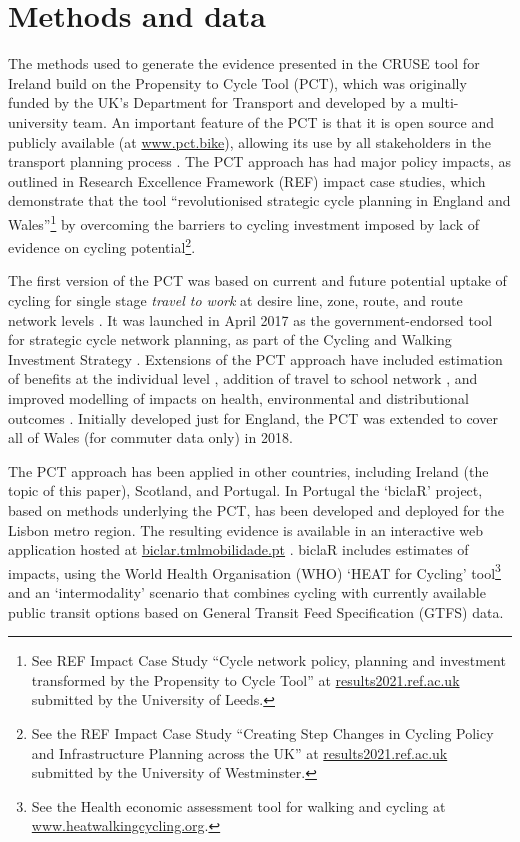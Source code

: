 \documentclass[
  super,
  preprint,
  3p]{elsarticle}
\begin{document}
\hypertarget{sec-methods}{%
\section{Methods and data}\label{sec-methods}}

The methods used to generate the evidence presented in the CRUSE tool
for Ireland build on the Propensity to Cycle Tool (PCT), which was
originally funded by the UK's Department for Transport and developed by
a multi-university team. An important feature of the PCT is that it is
open source and publicly available (at
\href{https://www.pct.bike/}{www.pct.bike}), allowing its use by all
stakeholders in the transport planning process \citep{lovelace2017}. The
PCT approach has had major policy impacts, as outlined in Research
Excellence Framework (REF) impact case studies, which demonstrate that
the tool ``revolutionised strategic cycle planning in England and
Wales''\footnote{See REF Impact Case Study ``Cycle network policy,
  planning and investment transformed by the Propensity to Cycle Tool''
  at
  \href{https://results2021.ref.ac.uk/impact/847d1191-7f25-46ba-a399-b481125edc8f}{results2021.ref.ac.uk}
  submitted by the University of Leeds.} by overcoming the barriers to
cycling investment imposed by lack of evidence on cycling
potential\footnote{See the REF Impact Case Study ``Creating Step Changes
  in Cycling Policy and Infrastructure Planning across the UK'' at
  \href{https://results2021.ref.ac.uk/impact/4BBF3436-FD10-4C75-9791-F5E98AB4411B}{results2021.ref.ac.uk}
  submitted by the University of Westminster.}.

The first version of the PCT was based on current and future potential
uptake of cycling for single stage \emph{travel to work} at desire line,
zone, route, and route network levels \citep{lovelace2016}. It was
launched in April 2017 as the government-endorsed tool for strategic
cycle network planning, as part of the Cycling and Walking Investment
Strategy \citep{cycling2017}. Extensions of the PCT approach have
included estimation of benefits at the individual level
\citep{woodcock2018}, addition of travel to school network
\citep{goodman2019}, and improved modelling of impacts on health,
environmental and distributional outcomes \citep{woodcock2021}.
Initially developed just for England, the PCT was extended to cover all
of Wales (for commuter data only) in 2018.

The PCT approach has been applied in other countries, including Ireland
(the topic of this paper), Scotland, and Portugal. In Portugal the
`biclaR' project, based on methods underlying the PCT, has been
developed and deployed for the Lisbon metro region. The resulting
evidence is available in an interactive web application hosted at
\href{https://biclar.tmlmobilidade.pt}{biclar.tmlmobilidade.pt}
\citep{felix2023}. biclaR includes estimates of impacts, using the World
Health Organisation (WHO) `HEAT for Cycling' tool\footnote{See the
  Health economic assessment tool for walking and cycling at
  \href{https://www.heatwalkingcycling.org/\#homepage}{www.heatwalkingcycling.org}.}
and an `intermodality' scenario that combines cycling with currently
available public transit options based on General Transit Feed
Specification (GTFS) data.
\end{document}
